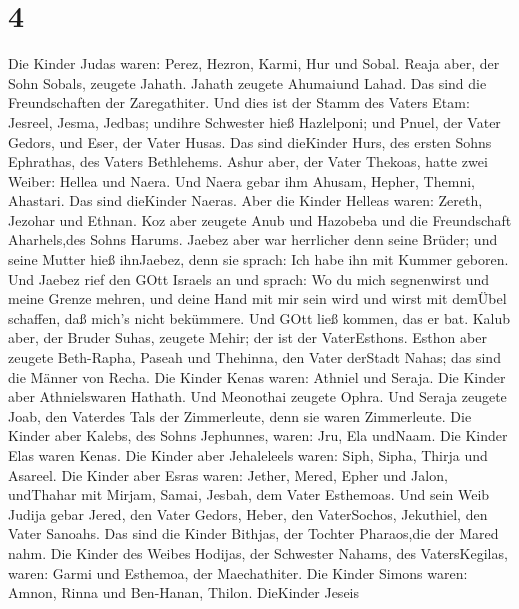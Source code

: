 \hypertarget{section-3}{%
\section{4}\label{section-3}}

 Die Kinder Judas waren: Perez, Hezron, Karmi, Hur und
Sobal.  Reaja aber, der Sohn Sobals, zeugete Jahath. Jahath
zeugete Ahumaiund Lahad. Das sind die Freundschaften der Zaregathiter.
 Und dies ist der Stamm des Vaters Etam: Jesreel, Jesma,
Jedbas; undihre Schwester hieß Hazlelponi;  und Pnuel, der
Vater Gedors, und Eser, der Vater Husas. Das sind dieKinder Hurs, des
ersten Sohns Ephrathas, des Vaters Bethlehems.  Ashur aber,
der Vater Thekoas, hatte zwei Weiber: Hellea und Naera.  Und
Naera gebar ihm Ahusam, Hepher, Themni, Ahastari. Das sind dieKinder
Naeras.  Aber die Kinder Helleas waren: Zereth, Jezohar und
Ethnan.  Koz aber zeugete Anub und Hazobeba und die
Freundschaft Aharhels,des Sohns Harums.  Jaebez aber war
herrlicher denn seine Brüder; und seine Mutter hieß ihnJaebez, denn sie
sprach: Ich habe ihn mit Kummer geboren.  Und Jaebez rief
den GOtt Israels an und sprach: Wo du mich segnenwirst und meine Grenze
mehren, und deine Hand mit mir sein wird und wirst mit demÜbel schaffen,
daß mich's nicht bekümmere. Und GOtt ließ kommen, das er bat.
 Kalub aber, der Bruder Suhas, zeugete Mehir; der ist der
VaterEsthons.  Esthon aber zeugete Beth-Rapha, Paseah und
Thehinna, den Vater derStadt Nahas; das sind die Männer von Recha.
 Die Kinder Kenas waren: Athniel und Seraja. Die Kinder
aber Athnielswaren Hathath.  Und Meonothai zeugete Ophra.
Und Seraja zeugete Joab, den Vaterdes Tals der Zimmerleute, denn sie
waren Zimmerleute.  Die Kinder aber Kalebs, des Sohns
Jephunnes, waren: Jru, Ela undNaam. Die Kinder Elas waren Kenas.
 Die Kinder aber Jehaleleels waren: Siph, Sipha, Thirja und
Asareel.  Die Kinder aber Esras waren: Jether, Mered, Epher
und Jalon, undThahar mit Mirjam, Samai, Jesbah, dem Vater Esthemoas.
 Und sein Weib Judija gebar Jered, den Vater Gedors, Heber,
den VaterSochos, Jekuthiel, den Vater Sanoahs. Das sind die Kinder
Bithjas, der Tochter Pharaos,die der Mared nahm.  Die
Kinder des Weibes Hodijas, der Schwester Nahams, des VatersKegilas,
waren: Garmi und Esthemoa, der Maechathiter.  Die Kinder
Simons waren: Amnon, Rinna und Ben-Hanan, Thilon. DieKinder Jeseis
